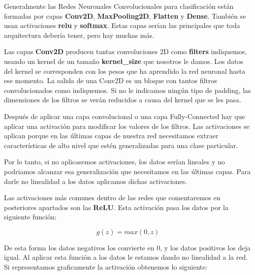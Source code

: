 \vspace{5 mm}

Generalmente las Redes Neuronales Convolucionales para clasificación están formadas por capas \textbf{Conv2D}, \textbf{MaxPooling2D}, \textbf{Flatten} y \textbf{Dense}. También se usan activaciones \textbf{relu} y \textbf{softmax}. Estas capas serían las principales que toda arquitectura debería tener, pero hay muchas más.

\vspace{2 mm}

Las capas \textbf{Conv2D} producen tantas convoluciones 2D como \textbf{filters} indiquemos, usando un kernel de un tamaño \textbf{kernel\_size} que nosotros le damos. Los datos del kernel se corresponden con los pesos que ha aprendido la red neuronal hasta ese momento. La salida de una Conv2D es un bloque con tantos filtros convolucionados como indiquemos. Si no le indicamos ningún tipo de padding, las dimensiones de los filtros se verán reducidos a causa del kernel que se les pasa.

\vspace{2 mm}

Después de aplicar una capa convolucional o una capa Fully-Connected hay que aplicar una activación para modificar los valores de los filtros. Las activaciones se aplican porque en las últimas capas de nuestra red necesitamos extraer características de alto nivel que estén generalizadas para una clase particular.

\vspace{2 mm}

Por lo tanto, si no aplicasemos activaciones, los datos serían lineales y no podriamos alcanzar esa generalización que necesitamos en las últimas capas. Para darle no linealidad a los datos aplicamos dichas activaciones.

\vspace{2 mm}

Las activaciones más comunes dentro de las redes que comentaremos en posteriores apartados son las \textbf{ReLU}. Esta activación pasa los datos por la siguiente función:

\[g(z) = max(0, z)\]

De esta forma los datos negativos los convierte en 0, y los datos positivos los deja igual. Al aplicar esta función a los datos le estamos dando no linealidad a la red. Si representamos graficamente la activación obtenemos lo siguiente:

\vspace{5 mm}

